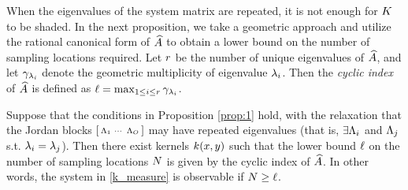 When the eigenvalues of the system matrix are repeated, it is not enough for $K$ to be shaded. 
In the next proposition, we take a geometric approach and utilize the rational canonical form  of $\widehat{A}$ to obtain a lower bound on the number of sampling locations required. Let $r$ be the number of unique eigenvalues of $\widehat{A}$, and let $\gamma_{\lambda_i}$ denote the geometric multiplicity of eigenvalue $\lambda_i$. Then the \emph{cyclic index} of $\widehat{A}$ is defined as $\ell = \max_{1\leq i\leq r}{\gamma_{\lambda_i}}$\cite{wonham1974linear}.

\begin{proposition}\label{prop:2}
 Suppose that the conditions in Proposition \ref{prop:1} hold, with the relaxation that
 the Jordan blocks $\left[\begin{smallmatrix}
                           \Lambda_1 &\cdots & \Lambda_{O}
                          \end{smallmatrix}\right]$ may have 
 repeated eigenvalues (that is, $\exists \Lambda_i$ and $\Lambda_j$ s.t. $\lambda_i = \lambda_j$). Then there exist kernels $k(x,y)$ such that the lower bound $\ell$ on the number of sampling locations $N$ is given by the cyclic index of $\widehat{A}$. In other words, the system in \eqref{k_measure} is observable if $ N \geq \ell$.
\end{proposition}
